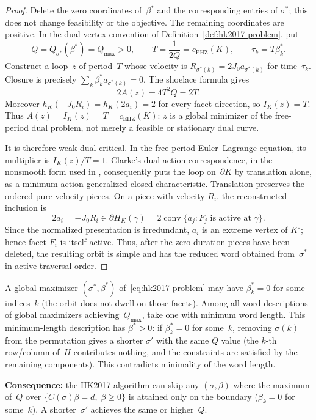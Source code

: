 \begin{proof}
Delete the zero coordinates of~$\beta^*$ and the corresponding entries of
$\sigma^*$; this does not change feasibility or the objective.  The remaining
coordinates are positive. In the dual-vertex convention of
Definition~\ref{def:hk2017-problem}, put
\[
  Q=Q_{\sigma^*}(\beta^*)=Q_{\max}>0,
  \qquad
  T=\frac{1}{2Q}=c_{\mathrm{EHZ}}(K),
  \qquad
  \tau_k=T\beta_k^*.
\]
Construct a loop~$z$ of period~$T$ whose velocity is
$R_{\sigma^*(k)}=2J_0a_{\sigma^*(k)}$ for time~$\tau_k$. Closure is precisely
$\sum_k\beta_k^*a_{\sigma^*(k)}=0$. The shoelace formula gives
\[
  2A(z)=4T^2Q=2T.
\]
Moreover $h_K(-J_0R_i)=h_K(2a_i)=2$ for every facet direction, so
$I_K(z)=T$. Thus $A(z)=I_K(z)=T=c_{\mathrm{EHZ}}(K)$: $z$ is a global
minimizer of the free-period dual problem, not merely a feasible or stationary
dual curve.

It is therefore weak dual critical. In the free-period Euler--Lagrange
equation, its multiplier is $I_K(z)/T=1$. Clarke's dual action correspondence,
in the nonsmooth form used in \cite[Lemma~2.1]{HK2017}, consequently puts the
loop on~$\partial K$ by translation alone, as a minimum-action generalized
closed characteristic. Translation preserves the ordered pure-velocity
pieces. On a piece with velocity $R_i$, the reconstructed inclusion is
\[
  2a_i=-J_0R_i\in\partial H_K(\gamma)
  =2\operatorname{conv}\{a_j:F_j\text{ is active at }\gamma\}.
\]
Since the normalized presentation is irredundant, $a_i$ is an extreme vertex
of $K^\circ$; hence facet $F_i$ is itself active. Thus, after the zero-duration
pieces have been deleted, the resulting orbit is simple and has the reduced
word obtained from~$\sigma^*$ in active traversal order.
\end{proof}



\begin{remark}\label{rem:min-support}
A global maximizer $(\sigma^*, \beta^*)$
of~\eqref{eq:hk2017-problem}
may have $\beta^*_k = 0$ for some indices~$k$
(the orbit does not dwell on those facets).
Among all word descriptions of global maximizers achieving~$Q_{\max}$,
take one with minimum word length.
This minimum-length description has $\beta^* > 0$:
if $\beta^*_k = 0$ for some~$k$, removing $\sigma(k)$
from the permutation gives a shorter $\sigma'$ with the same
$Q$ value (the $k$-th row/column of~$H$ contributes nothing,
and the constraints are satisfied by the remaining components).
This contradicts minimality of the word length.

\textbf{Consequence:} the HK2017 algorithm can skip any
$(\sigma, \beta)$ where the maximum of~$Q$ over
$\{C(\sigma)\beta = d,\; \beta \geq 0\}$
is attained only on the boundary ($\beta_k = 0$ for some~$k$).
A shorter~$\sigma'$ achieves the same or higher~$Q$.
\end{remark}

